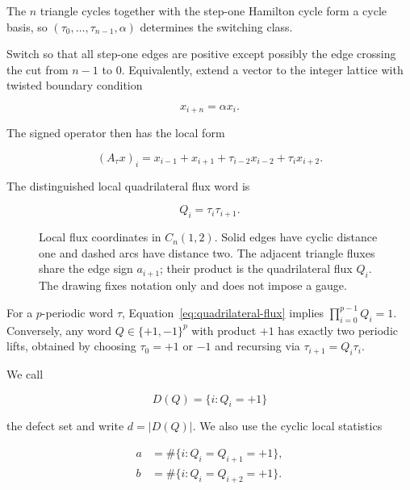 The \(n\) triangle cycles together with the step-one Hamilton cycle form a cycle
basis, so \((\tau_{0},\ldots,\tau_{n-1},\alpha)\) determines the switching class.

Switch so that all step-one edges are positive except possibly the edge
crossing the cut from \(n-1\) to \(0\). Equivalently, extend a vector to the
integer lattice with twisted boundary condition

\begin{equation}
x_{i+n}=\alpha x_i.
\end{equation}

The signed operator then has the local form

\begin{equation}
\label{eq:periodic-operator}
(A_\tau x)_i=x_{i-1}+x_{i+1}+\tau_{i-2}x_{i-2}+\tau_i x_{i+2}.
\end{equation}

The distinguished local quadrilateral flux word is

\begin{equation}
\label{eq:quadrilateral-flux}
Q_i=\tau_i \tau_{i+1}.
\end{equation}

\begin{figure}[tbp]
\centering

\caption{Local flux coordinates in \(C_n(1,2)\). Solid edges have cyclic
distance one and dashed arcs have distance two. The adjacent triangle fluxes
share the edge sign \(a_{i+1}\); their product is the quadrilateral flux
\(Q_i\). The drawing fixes notation only and does not impose a gauge.}
\label{fig:flux-coordinates}
\end{figure}

For a \(p\)-periodic word \(\tau\), Equation~\eqref{eq:quadrilateral-flux} implies
\(\prod_{i=0}^{p-1} Q_i=1\). Conversely, any word
\(Q \in \{+1,-1\}^p\) with product \(+1\) has exactly two periodic lifts, obtained by
choosing \(\tau_{0}=+1\) or \(-1\) and recursing via
\(\tau_{i+1}=Q_i \tau_i\).

We call

\begin{equation}
D(Q)=\{i:Q_i=+1\}
\end{equation}

the defect set and write \(d=\lvert D(Q)\rvert\). We also use the cyclic local statistics

\begin{equation}
\label{eq:local-defect-statistics}
\begin{aligned}
a&=\#\{i:Q_i=Q_{i+1}=+1\}, \\
b&=\#\{i:Q_i=Q_{i+2}=+1\}.
\end{aligned}
\end{equation}

